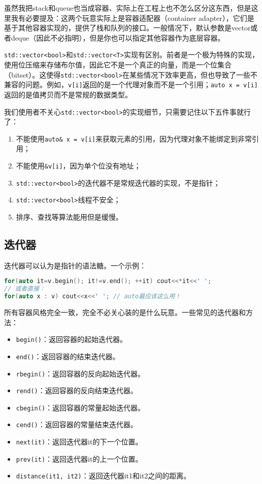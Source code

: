 \begin{note}
  虽然我把stack和queue也当成容器、实际上在工程上也不怎么区分这东西，但是这里我有必要提及：这两个玩意实际上是容器适配器（container adapter），它们是基于其他容器实现的，提供了栈和队列的接口。一般情况下，默认参数是vector或者deque（因此不必指明），但是你也可以指定其他容器作为底层容器。
\end{note}

\begin{note}
  \texttt{std::vector<bool>}和\texttt{std::vector<T>}实现有区别。前者是一个极为特殊的实现，使用位压缩来存储布尔值，因此它不是一个真正的向量，而是一个位集合（bitset）。这使得\texttt{std::vector<bool>}在某些情况下效率更高，但也导致了一些不兼容的问题。例如，\texttt{v[i]}返回的是一个代理对象而不是一个引用；\texttt{auto x = v[i]}返回的是值拷贝而不是常规的数据类型。

  我们使用者不关心\texttt{std::vector<bool>}的实现细节，只需要记住以下五件事就行了：
  \begin{enumerate}
    \item 不能使用\texttt{auto\& x = v[i]}来获取元素的引用，因为代理对象不能绑定到非常引用；
    \item 不能使用\texttt{\&v[i]}，因为单个位没有地址；
    \item \texttt{std::vector<bool>}的迭代器不是常规迭代器的实现，不是指针；
    \item \texttt{std::vector<bool>}线程不安全；
    \item 排序、查找等算法能用但是缓慢。
  \end{enumerate}
\end{note}

\subsection{迭代器}

迭代器可以认为是指针的语法糖。一个示例：
\begin{lstlisting}[language=C++]
for(auto it=v.begin(); it!=v.end(); ++it) cout<<*it<<' ';
// 或者直接：
for(auto x : v) cout<<x<<' '; // auto最应该这么用！
\end{lstlisting}

所有容器风格完全一致，完全不必关心装的是什么玩意。一些常见的迭代器和方法：
\begin{itemize}
  \item \texttt{begin()}：返回容器的起始迭代器。
  \item \texttt{end()}：返回容器的结束迭代器。
  \item \texttt{rbegin()}：返回容器的反向起始迭代器。
  \item \texttt{rend()}：返回容器的反向结束迭代器。
  \item \texttt{cbegin()}：返回容器的常量起始迭代器。
  \item \texttt{cend()}：返回容器的常量结束迭代器。
  \item \texttt{next(it)}：返回迭代器it的下一个位置。
  \item \texttt{prev(it)}：返回迭代器it的上一个位置。
  \item \texttt{distance(it1, it2)}：返回迭代器it1和it2之间的距离。
\end{itemize}


